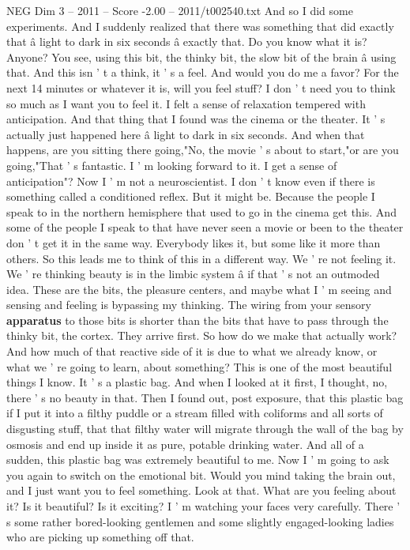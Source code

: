 \begin{textsample}{NEG Dim 3 – 2011 – Score -2.00 – 2011/t002540.txt}
And so I did some experiments.
And I suddenly realized that there was something that did exactly that â light to dark in six seconds â exactly that.
Do you know what it is?
Anyone?
You see, using this bit, the thinky bit, the slow bit of the brain â using that.
And this isn ' t a think, it ' s a feel.
And would you do me a favor?
For the next 14 minutes or whatever it is, will you feel stuff?
I don ' t need you to think so much as I want you to feel it.
I felt a sense of relaxation tempered with anticipation.
And that thing that I found was the cinema or the theater.
It ' s actually just happened here â light to dark in six seconds.
And when that happens, are you sitting there going,"No, the movie ' s about to start,"or are you going,"That ' s fantastic.
I ' m looking forward to it.
I get a sense of anticipation"?
Now I ' m not a neuroscientist.
I don ' t know even if there is something called a conditioned reflex.
But it might be.
Because the people I speak to in the northern hemisphere that used to go in the cinema get this.
And some of the people I speak to that have never seen a movie or been to the theater don ' t get it in the same way.
Everybody likes it, but some like it more than others.
So this leads me to think of this in a different way.
We ' re not feeling it.
We ' re thinking beauty is in the limbic system â if that ' s not an outmoded idea.
These are the bits, the pleasure centers, and maybe what I ' m seeing and sensing and feeling is bypassing my thinking.
The wiring from your sensory \textbf{apparatus} to those bits is shorter than the bits that have to pass through the thinky bit, the cortex.
They arrive first.
So how do we make that actually work?
And how much of that reactive side of it is due to what we already know, or what we ' re going to learn, about something?
This is one of the most beautiful things I know.
It ' s a plastic bag.
And when I looked at it first, I thought, no, there ' s no beauty in that.
Then I found out, post exposure, that this plastic bag if I put it into a filthy puddle or a stream filled with coliforms and all sorts of disgusting stuff, that that filthy water will migrate through the wall of the bag by osmosis and end up inside it as pure, potable drinking water.
And all of a sudden, this plastic bag was extremely beautiful to me.
Now I ' m going to ask you again to switch on the emotional bit.
Would you mind taking the brain out, and I just want you to feel something.
Look at that.
What are you feeling about it?
Is it beautiful?
Is it exciting?
I ' m watching your faces very carefully.
There ' s some rather bored-looking gentlemen and some slightly engaged-looking ladies who are picking up something off that.

\end{textsample}
